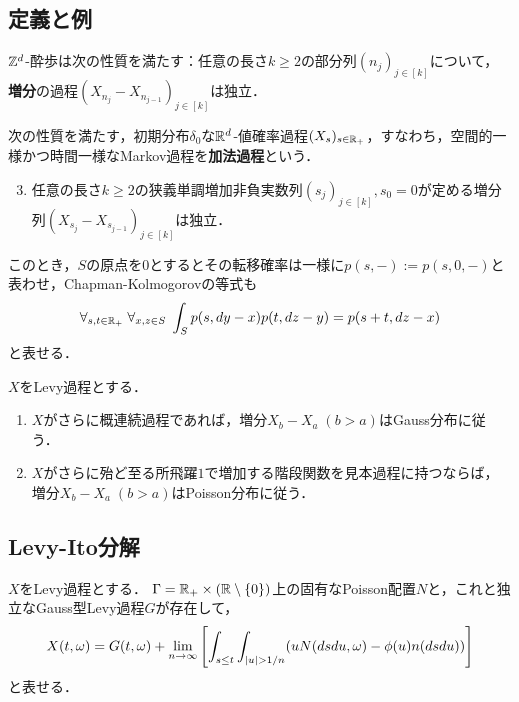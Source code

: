 \documentclass[uplatex,dvipdfmx]{jsreport}
\begin{document}
\subsection{定義と例}

\begin{example}
    $\mathbb{Z}^d$-酔歩は次の性質を満たす：任意の長さ$k\ge2$の部分列$(n_j)_{j\in[k]}$について，\textbf{増分}の過程$(X_{n_j}-X_{n_{j-1}})_{j\in[k]}$は独立．
\end{example}

\begin{definition}
    次の性質を満たす，初期分布$\delta_0$な$\mathbb{R}^d$-値確率過程$(X_s)_{s\in\mathbb{R}_+}$，すなわち，空間的一様かつ時間一様なMarkov過程を\textbf{加法過程}という．
    \begin{enumerate}\setcounter{enumi}{2}
        \item 任意の長さ$k\ge2$の狭義単調増加非負実数列$(s_j)_{j\in[k]},s_0=0$が定める増分列$(X_{s_j}-X_{s_{j-1}})_{j\in[k]}$は独立．
    \end{enumerate}
    このとき，$S$の原点を$0$とするとその転移確率は一様に$p(s,-):=p(s,0,-)$と表わせ，Chapman-Kolmogorovの等式も
    \[\forall_{s,t\in\mathbb{R}_+}\;\forall_{x,z\in S}\;\int_Sp(s,dy-x)p(t,dz-y)=p(s+t,dz-x)\]
    と表せる．
\end{definition}

\begin{theorem}[Gauss型とPoisson型Levy過程]
    $X$をLevy過程とする．
    \begin{enumerate}
        \item $X$がさらに概連続過程であれば，増分$X_b-X_a\;(b>a)$はGauss分布に従う．
        \item $X$がさらに殆ど至る所飛躍$1$で増加する階段関数を見本過程に持つならば，増分$X_b-X_a\;(b>a)$はPoisson分布に従う．
    \end{enumerate}
\end{theorem}

\subsection{Levy-Ito分解}

\begin{theorem}
    $X$をLevy過程とする．
    $\Gamma=\mathbb{R}_+\times(\mathbb{R}\setminus\{0\})$上の固有なPoisson配置$N$と，これと独立なGauss型Levy過程$G$が存在して，
    \[X(t,\omega)=G(t,\omega)+\lim_{n\to\infty}\left[\int_{s\le t}\int_{\lvert u\rvert>1/n}(uN(dsdu,\omega)-\phi(u)n(dsdu))\right]\]
    と表せる．
\end{theorem}
\end{document}
